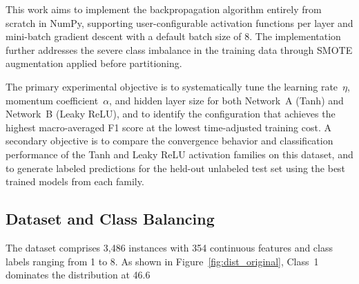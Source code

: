 \documentclass{acm_proc_article-sp} \usepackage{graphicx} \usepackage{amsmath} \usepackage{booktabs} \usepackage{url}
\begin{document}

This work aims to implement the backpropagation algorithm entirely from scratch in NumPy, supporting user-configurable activation functions per layer and mini-batch gradient descent with a default batch size of 8. The implementation further addresses the severe class imbalance in the training data through SMOTE augmentation applied before partitioning.

The primary experimental objective is to systematically tune the learning rate~$\eta$, momentum coefficient~$\alpha$, and hidden layer size for both Network~A (Tanh) and Network~B (Leaky ReLU), and to identify the configuration that achieves the highest macro-averaged F1 score at the lowest time-adjusted training cost. A secondary objective is to compare the convergence behavior and classification performance of the Tanh and Leaky ReLU activation families on this dataset, and to generate labeled predictions for the held-out unlabeled test set using the best trained models from each family.


\subsection{Dataset and Class Balancing}

The dataset comprises 3,486 instances with 354 continuous features and class labels ranging from 1 to 8. As shown in Figure~\ref{fig:dist_original}, Class~1 dominates the distribution at 46.6%
\end{document}
